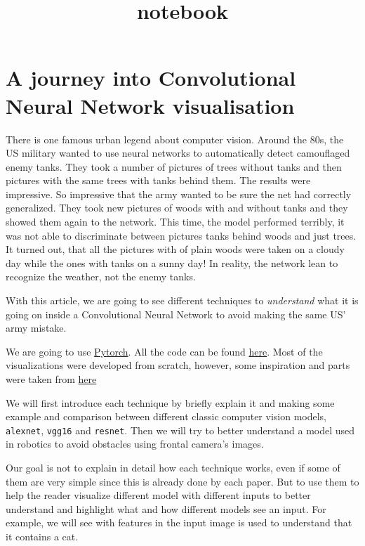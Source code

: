 \documentclass[11pt]{article}
\title{notebook}
\begin{document}
    
    
    \maketitle
    
    

    
    \section{A journey into Convolutional Neural Network
visualisation}\label{a-journey-into-convolutional-neural-network-visualisation}

There is one famous urban legend about computer vision. Around the 80s,
the US military wanted to use neural networks to automatically detect
camouflaged enemy tanks. They took a number of pictures of trees without
tanks and then pictures with the same trees with tanks behind them. The
results were impressive. So impressive that the army wanted to be sure
the net had correctly generalized. They took new pictures of woods with
and without tanks and they showed them again to the network. This time,
the model performed terribly, it was not able to discriminate between
pictures tanks behind woods and just trees. It turned out, that all the
pictures with of plain woods were taken on a cloudy day while the ones
with tanks on a sunny day! In reality, the network lean to recognize the
weather, not the enemy tanks.

With this article, we are going to see different techniques to
\emph{understand} what it is going on inside a Convolutional Neural
Network to avoid making the same US' army mistake.

We are going to use \href{https://pytorch.org/}{Pytorch}. All the code
can be found
\href{https://github.com/FrancescoSaverioZuppichini/A-journey-into-Convolutional-Neural-Network-visualization-}{here}.
Most of the visualizations were developed from scratch, however, some
inspiration and parts were taken from
\href{https://github.com/utkuozbulak/pytorch-cnn-visualizations/tree/master/src}{here}

We will first introduce each technique by briefly explain it and making
some example and comparison between different classic computer vision
models, \texttt{alexnet}, \texttt{vgg16} and \texttt{resnet}. Then we
will try to better understand a model used in robotics to avoid
obstacles using frontal camera's images.

Our goal is not to explain in detail how each technique works, even if
some of them are very simple since this is already done by each paper.
But to use them to help the reader visualize different model with
different inputs to better understand and highlight what and how
different models see an input. For example, we will see with features in
the input image is used to understand that it contains a cat.
\end{document}
